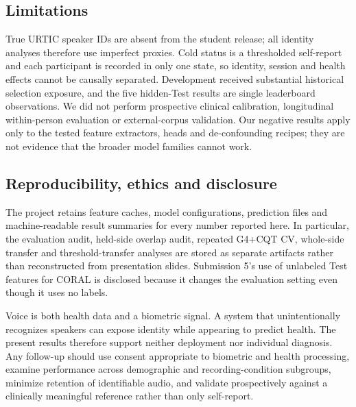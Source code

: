 \subsection{Limitations}

True URTIC speaker IDs are absent from the student release; all identity
analyses therefore use imperfect proxies. Cold status is a thresholded
self-report and each participant is recorded in only one state, so identity,
session and health effects cannot be causally separated. Development received
substantial historical selection exposure, and the five hidden-Test results
are single leaderboard observations. We did not perform prospective clinical
calibration, longitudinal within-person evaluation or external-corpus
validation. Our negative results apply only to the tested feature extractors,
heads and de-confounding recipes; they are not evidence that the broader model
families cannot work.

\subsection{Reproducibility, ethics and disclosure}

The project retains feature caches, model configurations, prediction files and
machine-readable result summaries for every number reported here. In
particular, the evaluation audit, held-side overlap audit, repeated G4+CQT CV,
whole-side transfer and threshold-transfer analyses are stored as separate
artifacts rather than reconstructed from presentation slides. Submission 5's
use of unlabeled Test features for CORAL is disclosed because it changes the
evaluation setting even though it uses no labels.

Voice is both health data and a biometric signal. A system that unintentionally
recognizes speakers can expose identity while appearing to predict health.
The present results therefore support neither deployment nor individual
diagnosis. Any follow-up should use consent appropriate to biometric and health
processing, examine performance across demographic and recording-condition
subgroups, minimize retention of identifiable audio, and validate prospectively
against a clinically meaningful reference rather than only self-report.
